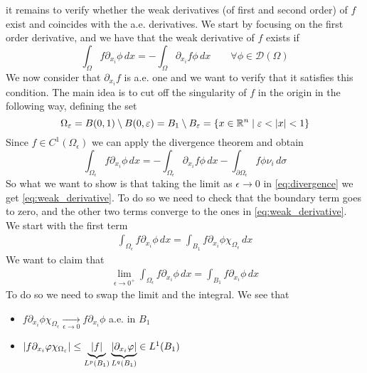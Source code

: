 it remains to verify whether the weak derivatives (of first and second order) of \(f\) exist 
and coincides with the a.e. derivatives.
We start by focusing on the first order derivative, and we have that the weak derivative of \(f\) exists if
\begin{equation}\label{eq:weak_derivative}
\int_\Omega f \partial_{x_i} \phi \, dx = - \int_\Omega \partial_{x_i} f \phi \, dx \qquad \forall \phi \in \mathcal{D}(\Omega)
\end{equation}
We now consider that $\partial_{x_i} f$ is a.e. one and we want to verify that it satisfies this condition. 
The main idea is to cut off the singularity of \(f\) in the origin in the following way, defining the set
\[
    \Omega_\varepsilon = B(0, 1) \setminus B(0, \varepsilon) = B_1 \setminus B_\varepsilon = \left\{ x \in \mathbb{R}^n \mid \varepsilon < \abs{x} < 1 \right\}
\]
Since \(f \in C^1(\Omega_\epsilon)\) we can apply the divergence theorem and obtain
\begin{equation}\label{eq:divergence}
\int_{\Omega_\epsilon} f \partial_{x_i} \phi \, dx = -\int_{\Omega_\epsilon} \partial_{x_i} f \phi \, dx - \int_{\partial\Omega_\epsilon} f \phi \nu_i \, d\sigma
\end{equation}
So what we want to show is that taking the limit as \(\epsilon \to 0\) in \eqref{eq:divergence} we get \eqref{eq:weak_derivative}. 
To do so we need to check that the boundary term goes to zero, and the other two terms converge to the ones in \eqref{eq:weak_derivative}. \\
We start with the first term
\[ 
    \begin{split}
        \int_{\Omega_\epsilon} f \partial_{x_i} \phi \, dx = \int_{B_1} f \partial_{x_i} \phi \chi_{\Omega_\epsilon} \, dx
    \end{split}
\]
We want to claim that 
\[
    \begin{split}
        \lim_{\epsilon \to 0^+} \int_{\Omega_\epsilon} f \partial_{x_i} \phi \, dx = \int_{B_1} f \partial_{x_i} \phi \, dx
    \end{split}
\]
To do so we need to swap the limit and the integral. We see that 
\begin{itemize}
    \item \(f \partial_{x_i} \phi \chi_{\Omega_\epsilon} \underset{\epsilon \to 0}{\longrightarrow} f \partial_{x_i} \phi\) a.e. in \(B_1\)
    \item \(\abs{f \partial_{x_i} \varphi \chi_{\Omega_\varepsilon}} \leq \underbrace{\abs{f}}_{L^p(B_1)} \underbrace{\abs{\partial_{x_i} \varphi}}_{L^q(B_1)} \in L^1(B_1)\)
\end{itemize}
